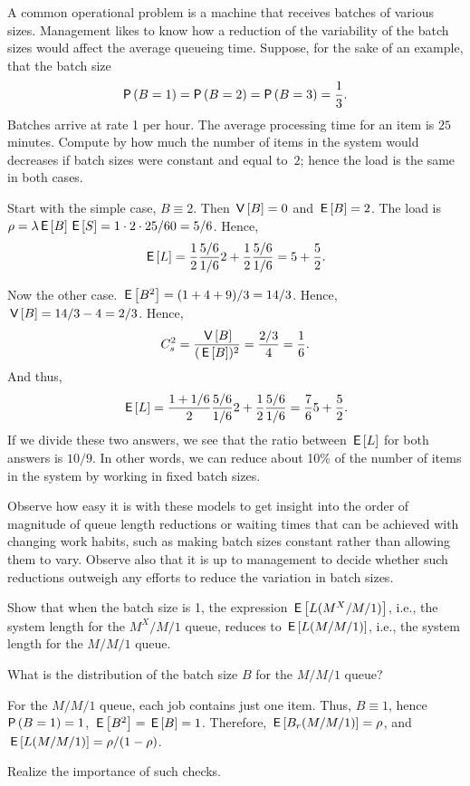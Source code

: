 \begin{exercise}
 A common operational problem is a machine that receives batches of
 various sizes. Management likes to know how a reduction of the
 variability of the batch sizes would affect the average queueing time.
 Suppose, for the sake of an example, that the batch size 
 \begin{equation*}
 \P{B=1} = \P{B=2} = \P{B=3} = \frac 13.
 \end{equation*}
 Batches arrive at rate 1 per hour.
 The average processing time for an item is $25$ minutes.
 Compute by how much the number of items in the system would decreases if batch sizes were constant and equal to~$2$; hence the load is the same in both cases.
\begin{solution}
 Start with the simple case, $B\equiv 2$. Then $\,\mathsf{V}\left[B\right]=0$ and
 $\,\mathsf{E}\left[B\right] = 2$. The load is $\rho=\lambda \,\mathsf{E}\left[B\right] \,\mathsf{E}\left[S\right] = 1\cdot 2 \cdot 25/60 = 5/6$. Hence,
 \begin{equation*}
 \,\mathsf{E}\left[L\right] = \frac 12 \frac{5/6}{1/6} 2 + \frac 12 \frac{5/6}{1/6} = 5 + \frac52.
 \end{equation*}

Now the other case. $\,\mathsf{E}\left[B^2\right] = (1+4+9)/3 = 14/3$. Hence, $\,\mathsf{V}\left[B\right]=14/3 - 4=2/3$. Hence, 
\begin{equation*}
C_s^2=\frac{\,\mathsf{V}\left[B\right]}{(\,\mathsf{E}\left[B\right])^2} = \frac{2/3}4 = \frac 16.
\end{equation*}
And thus, 
 \begin{equation*}
 \,\mathsf{E}\left[L\right] = \frac {1+1/6}2 \frac{5/6}{1/6} 2 + \frac 12 \frac{5/6}{1/6} = \frac76 5 + \frac 52.
 \end{equation*}
 If we divide these two answers, we see that the ratio between
 $\,\mathsf{E}\left[L\right]$ for both answers is $10/9$. In other words, we can
 reduce about 10\% of the number of items in the system by working
 in fixed batch sizes. 

Observe how easy it is with these models to get insight into the order of magnitude of queue length reductions or waiting times that can be achieved with changing work habits, such as making batch sizes constant rather than allowing them to vary.
Observe also that it is up to management to decide whether such reductions outweigh any efforts to reduce the variation in batch sizes.

\end{solution}

\end{exercise}

\begin{extra}
 Show that when the batch size is 1, the expression $\,\mathsf{E}\left[L(M^X/M/1)\right]$, i.e., the system length for the $M^X/M/1$ queue, reduces to
 $\,\mathsf{E}\left[L(M/M/1)\right]$, i.e., the system length for the $M/M/1$ queue. 
\begin{hint}
What is the distribution of the batch size $B$ for the $M/M/1$ queue?
\end{hint}
\begin{solution}
 For the $M/M/1$ queue, each job contains just one item. Thus,
 $B\equiv 1$, hence $\P{B=1}=1$, $\,\mathsf{E}\left[B^2\right]=\,\mathsf{E}\left[B\right] =1$. Therefore,
 $\,\mathsf{E}\left[B_r(M/M/1)\right]= \rho$, and $\,\mathsf{E}\left[L(M/M/1)\right]=\rho/(1-\rho)$. 
\end{solution}
Realize the importance of such checks.
\end{extra}


